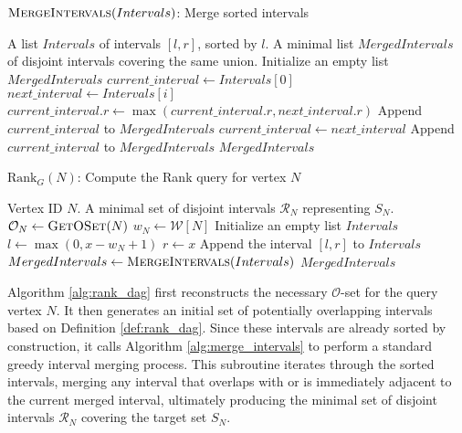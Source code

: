\begin{algorithm}
    \caption{$\textsc{MergeIntervals}(Intervals)$: Merge sorted intervals}
    \label{alg:merge_intervals}
    \small
    \begin{algorithmic}[1]
        \Require A list $Intervals$ of intervals $[l, r]$, sorted by $l$.
        \Ensure A minimal list $MergedIntervals$ of disjoint intervals covering the same union.
        \State Initialize an empty list $MergedIntervals$
        \State $current\_interval \gets Intervals[0]$
        \State $next\_interval \gets Intervals[i]$
        \State $current\_interval.r \gets \max(current\_interval.r, next\_interval.r)$
        \Else
        \State Append $current\_interval$ to $MergedIntervals$
        \State $current\_interval \gets next\_interval$
        \EndIf
        \EndFor
        \State Append $current\_interval$ to $MergedIntervals$
        \EndIf
        \State \Return $MergedIntervals$
    \end{algorithmic}
\end{algorithm}

\begin{algorithm}
    \caption{$\mathrm{Rank}_G(N)$: Compute the Rank query for vertex $N$}
    \label{alg:rank_dag}
    \small %
    \begin{algorithmic}[1]
        \Require Vertex ID $N$.
        \Ensure A minimal set of disjoint intervals $\mathcal{R}_N$ representing $S_N$.
        \State $\mathcal{O}_N \gets \textsc{GetOSet}(N)$
        \State $w_N \gets \mathcal{W}[N]$
        \State Initialize an empty list $Intervals$
        \State $l \gets \max(0, x - w_N + 1)$
        \State $r \gets x$
        \State Append the interval $[l, r]$ to $Intervals$
        \EndFor
        \State $MergedIntervals \gets \textsc{MergeIntervals}(Intervals)$
        \State \Return $MergedIntervals$
    \end{algorithmic}
\end{algorithm}

Algorithm \ref{alg:rank_dag} first reconstructs the necessary $\mathcal{O}$-set for the query vertex $N$. It then generates an initial set of potentially overlapping intervals based on Definition \ref{def:rank_dag}. Since these intervals are already sorted by construction, it calls Algorithm \ref{alg:merge_intervals} to perform a standard greedy interval merging process. This subroutine iterates through the sorted intervals, merging any interval that overlaps with or is immediately adjacent to the current merged interval, ultimately producing the minimal set of disjoint intervals $\mathcal{R}_N$ covering the target set $S_N$.

